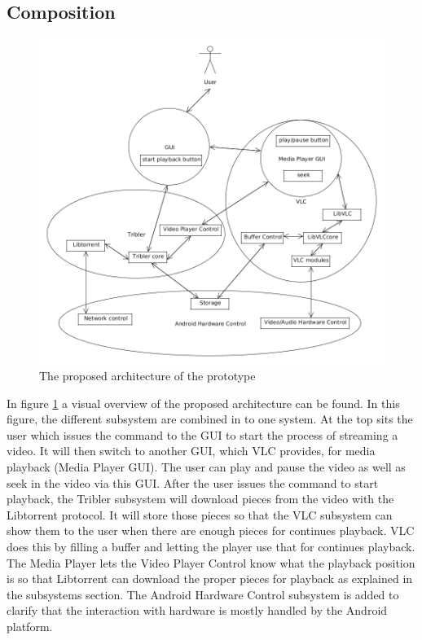 \subsection{Composition}
\label{sec:comp}
\begin{figure}[h!]
	\includegraphics[scale=0.47]{images/architecture_overview.png}
	\caption{The proposed architecture of the prototype}
	\label{fig:prop_arch}
\end{figure}
In figure \ref{fig:prop_arch} a visual overview of the proposed architecture can be found. In this figure, the different subsystem are combined in to one system. At the top sits the user which issues the command to the GUI to start the process of streaming a video. It will then switch to another GUI, which VLC provides, for media playback (Media Player GUI). The user can play and pause the video as well as seek in the video via this GUI. After the user issues the command to start playback, the Tribler subsystem will download pieces from the video with the Libtorrent protocol. It will store those pieces so that the VLC subsystem can show them to the user when there are enough pieces for continues playback. VLC does this by filling a buffer and letting the player use that for continues playback. The Media Player lets the Video Player Control know what the playback position is so that Libtorrent can download the proper pieces for playback as explained in the subsystems section. The Android Hardware Control subsystem is added to clarify that the interaction with hardware is mostly handled by the Android platform.